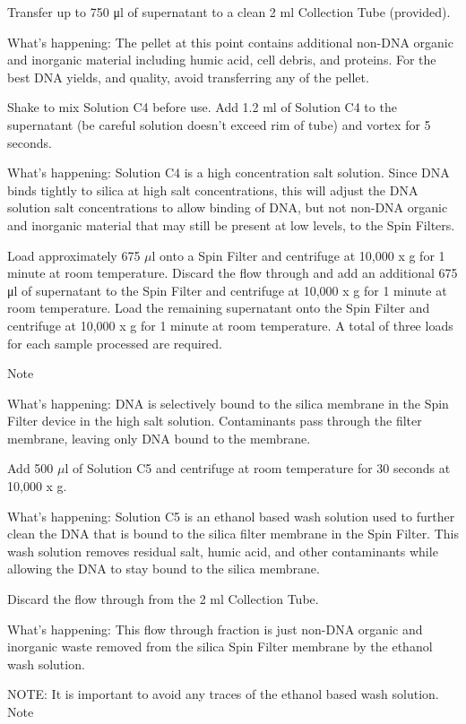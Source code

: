 \documentclass[12pt]{../SOP3_alpha}
\begin{document}
\NP Transfer up to 750 μl of supernatant to a clean 2 ml Collection Tube (provided).

What's happening: The pellet at this point contains additional non-DNA organic and inorganic material including humic acid, cell debris, and proteins. For the best DNA yields, and quality, avoid transferring any of the pellet.

\NP Shake to mix Solution C4 before use. Add 1.2 ml of Solution C4 to the supernatant (be careful solution doesn’t exceed rim of tube) and vortex for 5 seconds.

What's happening: Solution C4 is a high concentration salt solution. Since DNA binds tightly to silica at high salt concentrations, this will adjust the
DNA solution salt concentrations to allow binding of DNA, but not non-DNA organic and inorganic material that may still be present at low levels, to the Spin Filters.

\NP Load approximately 675 $\mu$l onto a Spin Filter and centrifuge at 10,000 x g for 1 minute at room temperature. Discard the flow through and add an additional 675 μl of supernatant to the Spin Filter and centrifuge at 10,000 x g for 1 minute at room temperature. Load the remaining supernatant onto the Spin Filter and centrifuge at 10,000 x g for 1 minute at room temperature. A total of three loads for each sample processed are required.

Note

What's happening: DNA is selectively bound to the silica membrane in the Spin Filter device in the high salt solution. Contaminants pass through the
filter membrane, leaving only DNA bound to the membrane.

\NP Add 500 $\mu$l of Solution C5 and centrifuge at room temperature for 30 seconds at 10,000 x g.

What's happening: Solution C5 is an ethanol based wash solution used to further clean the DNA that is bound to the silica filter membrane in the
Spin Filter. This wash solution removes residual salt, humic acid, and other contaminants while allowing the DNA to stay bound to the silica membrane.

\NP Discard the flow through from the 2 ml Collection Tube.

What's happening: This flow through fraction is just non-DNA organic and inorganic waste removed from the silica Spin Filter membrane by the ethanol wash solution.


NOTE: It is important to avoid any traces of the ethanol based wash solution.
Note
\end{document}
